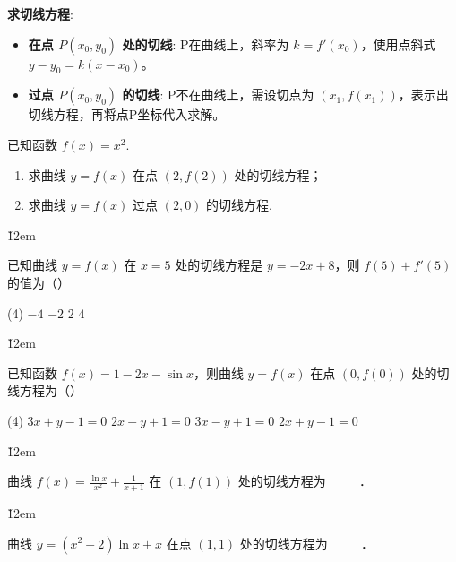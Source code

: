 \begin{theorem}
    \textbf{求切线方程}:
    \begin{itemize}
        \item \textbf{在点 $P(x_0, y_0)$ 处的切线}: P在曲线上，斜率为 $k=f'(x_0)$，使用点斜式 $y-y_0 = k(x-x_0)$。
        \item \textbf{过点 $P(x_0, y_0)$ 的切线}: P不在曲线上，需设切点为 $(x_1, f(x_1))$，表示出切线方程，再将点P坐标代入求解。
    \end{itemize}
\end{theorem}
\begin{example}
    已知函数 $f(x) = x^{2}$.
    \begin{enumerate}
        \item[(1)] 求曲线 $y = f(x)$ 在点 $(2,f(2))$ 处的切线方程；
        \item[(2)] 求曲线 $y = f(x)$ 过点 $(2,0)$ 的切线方程.
    \end{enumerate}
\end{example}

\v{12em}

\begin{example}
    已知曲线 $y = f(x)$ 在 $x = 5$ 处的切线方程是 $y = - 2x + 8$，则 $f(5) + f'(5)$ 的值为（\quad）
    \begin{tasks}(4)
        \task $- 4$ \task $- 2$ \task $2$ \task $4$
    \end{tasks}
\end{example}

\v{12em}

\begin{example}
    已知函数 $f(x) = 1 - 2x - \sin x$，则曲线 $y = f(x)$ 在点 $(0,f(0))$ 处的切线方程为（\quad）
    \begin{tasks}(4)
        \task $3x + y - 1 = 0$
        \task $2x - y + 1 = 0$
        \task $3x - y + 1 = 0$
        \task $2x + y - 1 = 0$
    \end{tasks}
\end{example}

\v{12em}

\begin{example}
    曲线 $f(x)=\frac{\ln x}{x^2}+\frac{1}{x+1}$ 在 $(1, f(1))$ 处的切线方程为
    \underline{$\qquad$} ．
\end{example}

\v{12em}

\begin{example}
    曲线 $y=\left(x^2-2\right) \ln x+x$ 在点 $(1,1)$ 处的切线方程为 \underline{$\qquad$} ．
\end{example}

